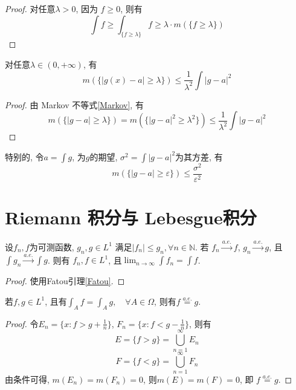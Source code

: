 \documentclass[12pt, a4paper, oneside, UTF8]{ctexbook}  %
\begin{document}
\begin{proof}
    对任意$\lambda>0$, 因为 $f\geq 0$, 则有
    $$ \int f\geq \int_{\{f\geq\lambda\}}f\geq \lambda \cdot m(\{f\geq\lambda\}) $$
\end{proof}


\begin{thm}\label{Chebyshev}
    对任意$\lambda \in(0, +\infty)$, 有
    $$ m(\{ |g(x)-a|\geq\lambda \})\leq\frac{1}{\lambda^2}\int |g-a|^2 $$
\end{thm}

\begin{proof}
    由 Markov 不等式\ref{Markov}, 有
    $$ m(\{|g-a|\geq\lambda\})=m(\{|g-a|^2\geq\lambda^2\})\leq\frac{1}{\lambda^2}\int |g-a|^2 $$
\end{proof}

\begin{rmk}
    特别的, 令$a=\int g$, 为$g$的期望, $\sigma^2=\int |g-a|^2$为其方差, 有
    $$ m(\{|g-a|\geq\varepsilon\})\leq\frac{\sigma^2}{\varepsilon^2} $$
\end{rmk}


\section{Riemann 积分与 Lebesgue积分}

\begin{thm}[广义控制收敛定理]\label{General control}
    设$f_n, f$为可测函数, $g_n, g\in L^1$ 满足$|f_n|\leq g_n, \forall n\in \mathbb{N}$. 若
    $f_n \stackrel{a.e.}{\rightarrow} f$, $g_n \stackrel{a.e.}{\rightarrow} g$, 
    且$\int g_n \stackrel{a.e.}{\rightarrow} \int g$. 则有 $f_n, f\in L^1$, 
    且$\lim_{n\to\infty}\int f_n = \int f$.
\end{thm}

\begin{proof}
    使用Fatou引理\ref{Fatou}.
\end{proof}


\begin{thm}
    若$f, g\in L^1$, 且有$\int_{A} f = \int_{A} g , \quad \forall A \in \Omega $, 则有$ f \stackrel{a.e.}{=} g $.
\end{thm}

\begin{proof}
    令$E_n = \{ x:f>g+\frac{1}{n} \}$, $F_n = \{ x:f<g-\frac{1}{n} \}$, 则有
    $$ E = \{ f>g \} = \bigcup_{n=1}^\infty E_n $$
    $$ F = \{ f<g \} = \bigcup_{n=1}^\infty F_n $$
    由条件可得, $m(E_n) = m(F_n) = 0$, 则$m(E) = m(F) = 0$, 即 $ f \stackrel{a.e.}{=} g $.
\end{proof}
\end{document}

